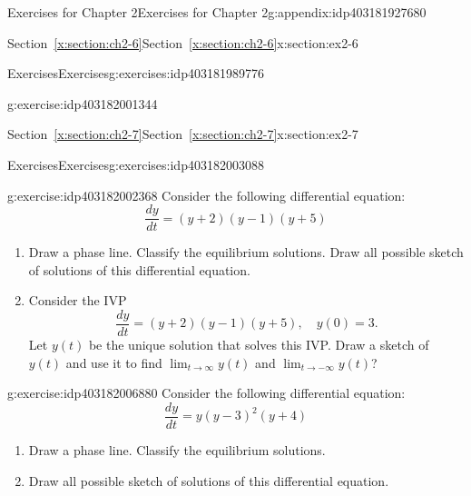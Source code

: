 \documentclass[oneside,10pt,]{book}
\newcommand{\xreffont}{\relax}
\numberwithin{equation}{section}
\numberwithin{equation}{section}
\begin{document}
\begin{appendixptx}{Exercises for Chapter 2}{}{Exercises for Chapter 2}{}{}{g:appendix:idp403181927680}
\begin{sectionptx}{Section~{\xreffont\ref*{x:section:ch2-6}}}{}{Section~{\xreffont\ref*{x:section:ch2-6}}}{}{}{x:section:ex2-6}
\begin{exercises-subsection-numberless}{Exercises}{}{Exercises}{}{}{g:exercises:idp403181989776}
\begin{divisionexercise}{5}{}{}{g:exercise:idp403182001344}
\begin{enumerate}[label=(\alph*)]
\end{enumerate}
\end{divisionexercise}%
\end{exercises-subsection-numberless}
\end{sectionptx}
%
%
\typeout{************************************************}
\typeout{Section C.7 Section~{\xreffont\ref*{x:section:ch2-7}}}
\typeout{************************************************}
%
\begin{sectionptx}{Section~{\xreffont\ref*{x:section:ch2-7}}}{}{Section~{\xreffont\ref*{x:section:ch2-7}}}{}{}{x:section:ex2-7}
%
%
\typeout{************************************************}
\typeout{************************************************}
%
\begin{exercises-subsection-numberless}{Exercises}{}{Exercises}{}{}{g:exercises:idp403182003088}
\begin{divisionexercise}{1}{}{}{g:exercise:idp403182002368}%
Consider the following differential equation:%
\begin{equation*}
\frac{dy}{dt}=\left(y+2\right)\left(y-1\right)\left(y+5\right)
\end{equation*}
%
%
\begin{enumerate}[label=(\alph*)]
\item{}Draw a phase line. Classify the equilibrium solutions. Draw all possible sketch of solutions of this differential equation.%
\item{}Consider the IVP%
\begin{equation*}
\frac{dy}{dt}=\left(y+2\right)\left(y-1\right)\left(y+5\right),\,\,\,\,\,\,y(0)=3.
\end{equation*}
Let \(y(t)\) be the unique solution that solves this IVP. Draw a sketch of \(y(t)\) and use it to find \(\lim_{t\to\infty}y(t)\) and \(\lim_{t\to-\infty}y(t)\)?%
\end{enumerate}
\end{divisionexercise}%
\begin{divisionexercise}{2}{}{}{g:exercise:idp403182006880}%
Consider the following differential equation:%
\begin{equation*}
\frac{dy}{dt}=y\left(y-3\right)^{2}\left(y+4\right)
\end{equation*}
%
%
\begin{enumerate}[label=(\alph*)]
\item{}Draw a phase line. Classify the equilibrium solutions.%
\item{}Draw all possible sketch of solutions of this differential equation.%

\end{enumerate}
\end{divisionexercise}
\end{exercises-subsection-numberless}
\end{sectionptx}
\end{appendixptx}
\end{document}
